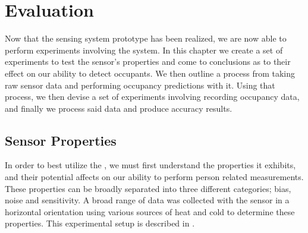 \documentclass[../thesis/thesis.tex]{subfiles}
\begin{document}
 \chapter{Evaluation}

 Now that the sensing system prototype has been realized, we are now able to perform experiments involving the system. In this chapter we create a set of experiments to test the sensor's properties and come to conclusions as to their effect on our ability to detect occupants. We then outline a process from taking raw sensor data and performing occupancy predictions with it. Using that process, we then devise a set of experiments involving recording occupancy data, and finally we process said data and produce accuracy results.

\section{Sensor Properties}

In order to best utilize the \mlx, we must first understand the properties it exhibits, and their potential affects on our ability to perform person related measurements. These properties can be broadly separated into three different categories; bias, noise and sensitivity. A broad range of data was collected with the sensor in a horizontal orientation using various sources of heat and cold to determine these properties. This experimental setup is described in .
\end{document}
